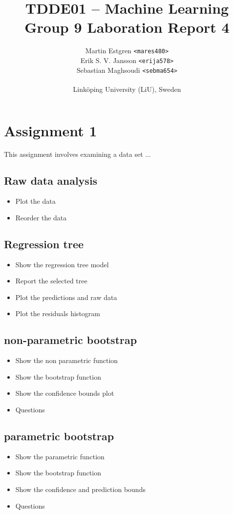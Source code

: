 \documentclass[a4paper, twocolumn]{article}
\title{TDDE01 -- Machine Learning \\
       Group 9 Laboration Report 4}
\author{{Martin Estgren \texttt{<mares480>}} \\
        {Erik S. V. Jansson \texttt{<erija578>}} \\
        {Sebastian Maghsoudi \texttt{<sebma654>}} \\~\\
        {Linköping University (LiU), Sweden}}
\begin{document}
    \maketitle %

    \section*{Assignment 1}
    This assignment involves examining a data set ...

    \subsection{Raw data analysis}
    \begin{itemize}
        \item Plot the data
        \item Reorder the data
    \end{itemize}
    \subsection{Regression tree}
    \begin{itemize}
        \item Show the regression tree model
        \item Report the selected tree
        \item Plot the predictions and raw data
        \item Plot the residuals histogram
    \end{itemize}
    \subsection{non-parametric bootstrap}
    \begin{itemize}
        \item Show the non parametric function
        \item Show the bootstrap function
        \item Show the confidence bounds plot
        \item Questions
    \end{itemize}
    \subsection{parametric bootstrap}
    \begin{itemize}
        \item Show the parametric function
        \item Show the bootstrap function
        \item Show the confidence and prediction bounds
        \item Questions
    \end{itemize}
\end{document}

